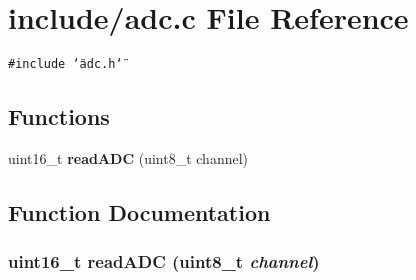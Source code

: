 \section{include/adc.c File Reference}
\label{adc_8c}
{\tt \#include \char`\"{}adc.h\char`\"{}}\par
\subsection*{Functions}
\begin{CompactItemize}
\item 
uint16\_\-t {\bf readADC} (uint8\_\-t channel)
\end{CompactItemize}


\subsection{Function Documentation}
\subsubsection{\setlength{\rightskip}{0pt plus 5cm}uint16\_\-t readADC (uint8\_\-t {\em channel})}\label{adc_8c_812736491523e54e6bf10a142821e7fe}


